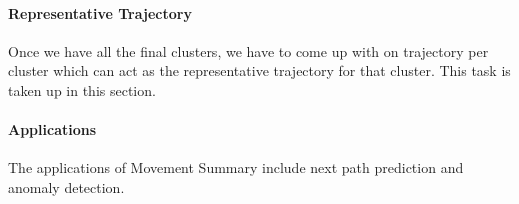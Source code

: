 \paragraph{Representative Trajectory} 
Once we have all the final clusters, we have to come up with on trajectory per cluster which can act as the representative trajectory for that cluster. This task is taken up in this section.
\paragraph{Applications}
The applications of Movement Summary include next path prediction and anomaly detection.
 
